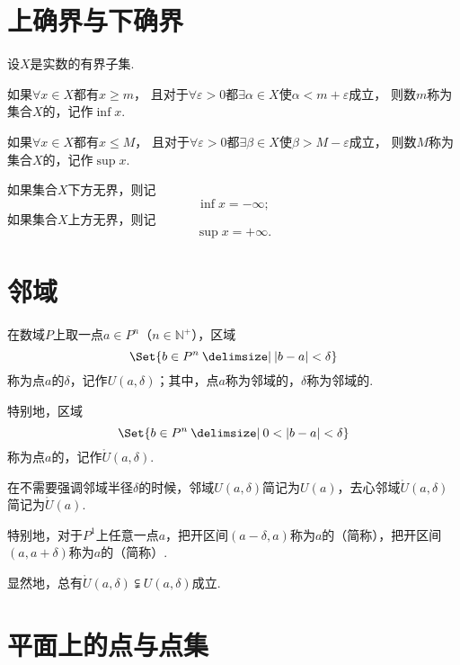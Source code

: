 \section{上确界与下确界}
\begin{definition}
设\(X\)是实数的有界子集.

如果\(\forall x \in X\)都有\(x \geqslant m\)，%
且对于\(\forall \varepsilon > 0\)都\(\exists \alpha \in X\)使\(\alpha < m + \varepsilon\)成立，%
则数\(m\)称为集合\(X\)的，记作\(\inf{x}\).

如果\(\forall x \in X\)都有\(x \leqslant M\)，%
且对于\(\forall \varepsilon > 0\)都\(\exists \beta \in X\)使\(\beta > M - \varepsilon\)成立，%
则数\(M\)称为集合\(X\)的，记作\(\sup{x}\).

如果集合\(X\)下方无界，则记\[
\inf{x} = -\infty;
\]如果集合\(X\)上方无界，则记\[
\sup{x} = +\infty.
\]
\end{definition}

\section{邻域}
\begin{definition}
在数域\(P\)上取一点\(a \in P^n\)（\(n\in\mathbb{N}^+\)），区域\[
\Set{b \in P^n \given \abs{b - a} < \delta}
\]称为点\(a\)的\(\delta\)，记作\(U(a,\delta)\)；其中，点\(a\)称为邻域的，\(\delta\)称为邻域的.

特别地，区域\[
\Set{b \in P^n \given 0 < \abs{b - a} < \delta}
\]称为点\(a\)的，记作\(\mathring{U}(a,\delta)\).

在不需要强调邻域半径\(\delta\)的时候，邻域\(U(a,\delta)\)简记为\(U(a)\)，去心邻域\(\mathring{U}(a,\delta)\)简记为\(\mathring{U}(a)\).

特别地，对于\(P^1\)上任意一点\(a\)，把开区间\((a-\delta,a)\)称为\(a\)的（简称），把开区间\((a,a+\delta)\)称为\(a\)的（简称）.
\end{definition}

\begin{property}
显然地，总有\(\mathring{U}(a,\delta) \subsetneqq U(a,\delta)\)成立.
\end{property}

\section{平面上的点与点集}

